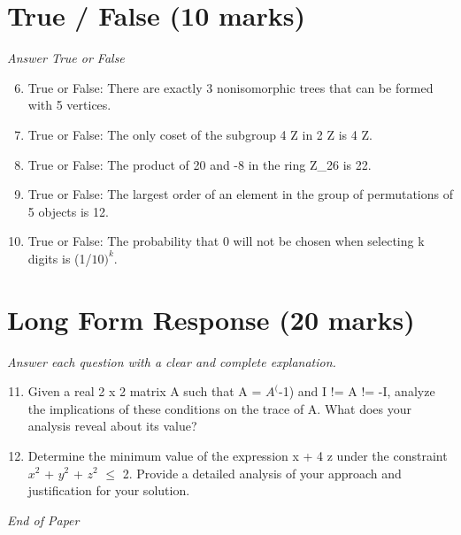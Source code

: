 \documentclass[12pt]{article}
\begin{document}
\section*{True / False (10 marks)}
\textit{Answer True or False}
\begin{enumerate}[label=\arabic*.]
\setcounter{enumi}{5}
\item True or False: There are exactly 3 nonisomorphic trees that can be formed with 5 vertices.
\item True or False: The only coset of the subgroup 4 Z in 2 Z is 4 Z.
\item True or False: The product of 20 and -8 in the ring Z\_26 is 22.
\item True or False: The largest order of an element in the group of permutations of 5 objects is 12.
\item True or False: The probability that 0 will not be chosen when selecting k digits is (1/$10)^k$.
\end{enumerate}

\section*{Long Form Response (20 marks)}
\textit{Answer each question with a clear and complete explanation.}
\begin{enumerate}[label=\arabic*.]
\setcounter{enumi}{10}
\item Given a real 2 x 2 matrix A such that A = $A^($-1) and I != A != -I, analyze the implications of these conditions on the trace of A. What does your analysis reveal about its value?
\item Determine the minimum value of the expression x + 4 z under the constraint $x^2$ + $y^2$ + $z^2$ \ensuremath{\leq} 2. Provide a detailed analysis of your approach and justification for your solution.
\end{enumerate}

\vfill
\noindent\textit{End of Paper}
\end{document}
